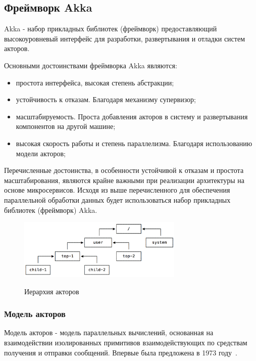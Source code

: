 \subsection{Фреймворк Akka}
\label{sec:techs:akka}

Akka - набор прикладных библиотек (фреймворк) предоставляющий высокоуровневый интерфейс для разработки, развертывания и отладки систем акторов.

Основными достоинствами фреймворка Akka являются:
\begin{itemize}
  \item простота интерфейса, высокая степень абстракции;
  \item устойчивость к отказам. Благодаря механизму супервизор;
  \item масштабируемость. Проста добавления акторов в систему и развертывания компонентов на другой машине;
  \item высокая скорость работы и степень параллелизма. Благодаря использованию модели акторов;
\end{itemize}

Перечисленные достоинства, в особенности устойчивой к отказам и простота масштабирования, являются крайне важными при реализации архитектуры на основе микросервисов. Исходя из выше перечисленного для обеспечения параллельной обработки данных будет использоваться набор прикладных библиотек (фреймворк) Akka. 

\begin{figure}[ht]
    \centering
    \includegraphics[width=0.7\textwidth]{figures/actors_hier.png}
    \label{fig:techs:akka:actor_hierar}
    \caption{Иерархия акторов}
\end{figure}

\subsubsection{Модель акторов}
\label{sec:techs:akka:actor_model}
Модель акторов - модель параллельных вычислений, основанная на взаимодействии изолированных примитивов взаимодействующих по средствам получения и отправки сообщений. Впервые была предложена в 1973 году~\cite{hewitt_bishop_steiger_actor_model}.

